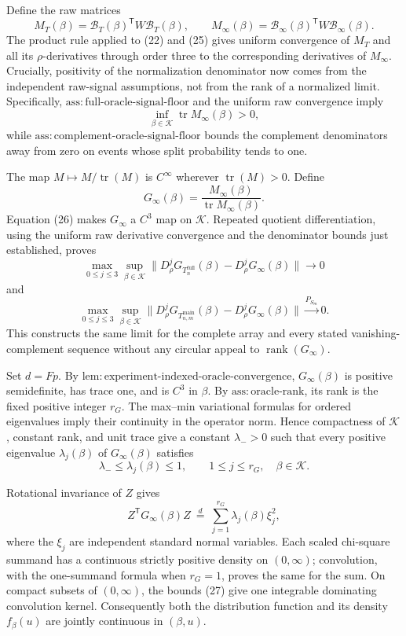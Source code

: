 Define the raw matrices
\[
M_T(\beta)=\mathcal B_T(\beta)^{\mathsf T}W\mathcal B_T(\beta),
\qquad
M_\infty(\beta)=\mathcal B_\infty(\beta)^{\mathsf T}
W\mathcal B_\infty(\beta).
\]
The product rule applied to (22) and (25) gives uniform convergence of \(M_T\) and all its \(\rho\)-derivatives through order three to the corresponding derivatives of \(M_\infty\).  Crucially, positivity of the normalization denominator now comes from the independent raw-signal assumptions, not from the rank of a normalized limit.  Specifically,
\(\mathrm{ass{:}full\text{-}oracle\text{-}signal\text{-}floor}\) and the uniform raw convergence imply
\[
\inf_{\beta\in\mathcal K}\operatorname{tr}M_\infty(\beta)>0,
\tag{26}
\]
while \(\mathrm{ass{:}complement\text{-}oracle\text{-}signal\text{-}floor}\) bounds the complement denominators away from zero on events whose split probability tends to one.

The map \(M\mapsto M/\operatorname{tr}(M)\) is \(C^\infty\) wherever
\(\operatorname{tr}(M)>0\).  Define
\[
G_\infty(\beta)=
\frac{M_\infty(\beta)}{\operatorname{tr}M_\infty(\beta)}.
\]
Equation (26) makes \(G_\infty\) a \(C^3\) map on \(\mathcal K\).  Repeated quotient differentiation, using the uniform raw derivative convergence and the denominator bounds just established, proves
\[
\max_{0\leq j\leq3}\sup_{\beta\in\mathcal K}
\|D_\rho^jG_{T_n^{\mathrm{full}}}(\beta)
-D_\rho^jG_\infty(\beta)\|\to0
\]
and
\[
\max_{0\leq j\leq3}\sup_{\beta\in\mathcal K}
\|D_\rho^jG_{T_{n,m}^{\mathrm{main}}}(\beta)
-D_\rho^jG_\infty(\beta)\|
\xrightarrow{P_{S_m}}0.
\]
This constructs the same limit for the complete array and every stated vanishing-complement sequence without any circular appeal to \(\operatorname{rank}(G_\infty)\).

Set \(d=Fp\).  By \(\mathrm{lem{:}experiment\text{-}indexed\text{-}oracle\text{-}convergence}\), \(G_\infty(\beta)\) is positive semidefinite, has trace one, and is \(C^3\) in \(\beta\).  By \(\mathrm{ass{:}oracle\text{-}rank}\), its rank is the fixed positive integer \(r_G\).  The max--min variational formulas for ordered eigenvalues imply their continuity in the operator norm.  Hence compactness of \(\mathcal K\), constant rank, and unit trace give a constant \(\lambda_->0\) such that every positive eigenvalue \(\lambda_j(\beta)\) of \(G_\infty(\beta)\) satisfies
\[
\lambda_-\leq\lambda_j(\beta)\leq1,
\qquad 1\leq j\leq r_G,\quad\beta\in\mathcal K.
\tag{27}
\]

Rotational invariance of \(Z\) gives
\[
Z^{\mathsf T}G_\infty(\beta)Z
\ \stackrel{d}{=}\
\sum_{j=1}^{r_G}\lambda_j(\beta)\xi_j^2,
\tag{28}
\]
where the \(\xi_j\) are independent standard normal variables.  Each scaled chi-square summand has a continuous strictly positive density on \((0,\infty)\); convolution, with the one-summand formula when \(r_G=1\), proves the same for the sum.  On compact subsets of \((0,\infty)\), the bounds (27) give one integrable dominating convolution kernel.  Consequently both the distribution function and its density \(f_\beta(u)\) are jointly continuous in \((\beta,u)\).


